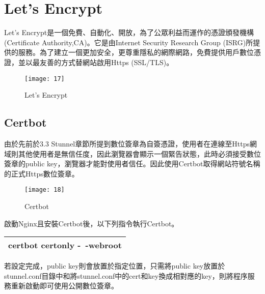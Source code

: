 \renewcommand{\baselinestretch}{20} %
\section{Let's Encrypt}
\par
\renewcommand{\baselinestretch}{1} %
\twelve \qquad Let’s Encrypt是一個免費、自動化、開放，為了公眾利益而運作的憑證頒發機構(Certificate Authority,CA)。它是由Internet Security Research Group (ISRG)所提供的服務。為了建立一個更加安全，更尊重隱私的網際網路，免費提供用戶數位憑證，並以最友善的方式替網站啟用Https (SSL/TLS)。
\par
\renewcommand{\baselinestretch}{1.7} %
\begin{figure}[hbt!]
\begin{center}
\texttt{[image: 17]}
\caption{\large Let's Encrypt}\label{fig.Let's Encrypt}
\end{center}
\end{figure}
\par

\renewcommand{\baselinestretch}{20} %
\subsection{Certbot}
\par
\renewcommand{\baselinestretch}{1} %
\twelve \qquad 由於先前於3.3 Stunnel章節所提到數位簽章為自簽憑證，使用者在連線至Https網域則其他使用者是無信任度，因此瀏覽器會顯示一個緊告狀態，此時必須接受數位簽章的public key，瀏覽器才能對使用者信任。因此使用Certbot取得網站符號名稱的正式Https數位簽章。
\\
\par
\renewcommand{\baselinestretch}{1.7} %
\begin{figure}[hbt!]
\begin{center}
\texttt{[image: 18]}
\caption{\large Certbot}\label{Certbot}
\end{center}
\end{figure}
\par
\renewcommand{\baselinestretch}{1} %
\twelve \hspace{0.5em} 啟動Nginx且安裝Certbot後，以下列指令執行Certbot。
\par
\begin{center}
\begin{tabular}{||p{15cm}|} %
\hline
\textbf{certbot certonly -\ -webroot}
\\
\hline
\end{tabular}
\end{center}
\par
\renewcommand{\baselinestretch}{1} %
\twelve \hspace{0.5em} 若設定完成，public key則會放置於指定位置，只需將public key放置於stunnel.conf目錄中和將stunnel.conf中的cert和key換成相對應的key，則將程序服務重新啟動即可使用公開數位簽章。
\par

